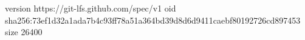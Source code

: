 version https://git-lfs.github.com/spec/v1
oid sha256:73ef1d32a1ada7b4c93ff78a51a364bd39d8d6d9411caebf80192726cd897453
size 26400

